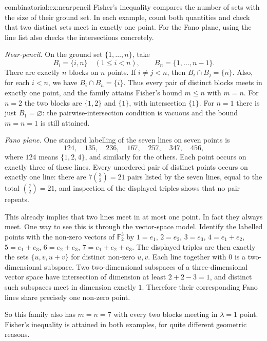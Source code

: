 \begin{solution}{combinatorial:ex:nearpencil}
\idea Fisher's inequality compares the number of sets with the size of their ground set. In each example, count both quantities and check that two distinct sets meet in exactly one point. For the Fano plane, using the line list also checks the intersections concretely.

\writeup \emph{Near-pencil.} On the ground set $\{1,\ldots,n\}$, take
\[
B_i=\{i,n\}\quad(1\le i<n),\qquad
B_n=\{1,\ldots,n-1\}.
\]
There are exactly $n$ blocks on $n$ points. If $i\ne j<n$, then $B_i\cap B_j=\{n\}$. Also, for each $i<n$, we have $B_i\cap B_n=\{i\}$. Thus every pair of distinct blocks meets in exactly one point, and the family attains Fisher's bound $m\le n$ with $m=n$.
For $n=2$ the two blocks are $\{1,2\}$ and $\{1\}$, with intersection $\{1\}$.
For $n=1$ there is just $B_1=\varnothing$: the pairwise-intersection
condition is vacuous and the bound $m=n=1$ is still attained.

\emph{Fano plane.} One standard labelling of the seven lines on seven points is
\[
124,\quad135,\quad236,\quad167,\quad257,\quad347,\quad456,
\]
where $124$ means $\{1,2,4\}$, and similarly for the others. Each point occurs on exactly three of these lines. Every unordered pair of distinct points occurs on exactly one line: there are $7\binom32=21$ pairs listed by the seven lines, equal to the total $\binom72=21$, and inspection of the displayed triples shows that no pair repeats.

This already implies that two lines meet in at most one point. In fact they always meet. One way to see this is through the vector-space model. Identify the labelled points with the non-zero vectors of $\mathbb F_2^3$ by $1=e_1$, $2=e_2$, $3=e_3$, $4=e_1+e_2$, $5=e_1+e_3$, $6=e_2+e_3$, $7=e_1+e_2+e_3$. The displayed triples are then exactly the sets $\{u,v,u+v\}$ for distinct non-zero $u,v$. Each line together with $0$ is a two-dimensional subspace. Two two-dimensional subspaces of a three-dimensional vector space have intersection of dimension at least $2+2-3=1$, and distinct such subspaces meet in dimension exactly $1$. Therefore their corresponding Fano lines share precisely one non-zero point.

So this family also has $m=n=7$ with every two blocks meeting in $\lambda=1$ point. Fisher's inequality is attained in both examples, for quite different geometric reasons.
\end{solution}

